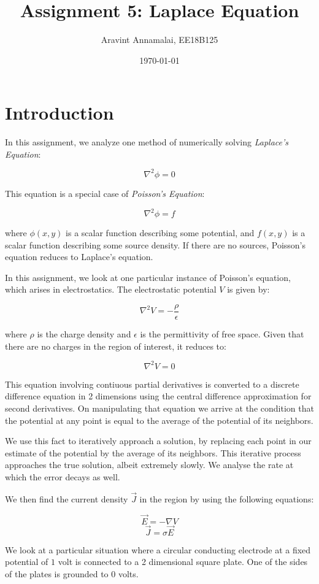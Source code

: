 \documentclass[11pt, a4paper]{article}
\title{Assignment 5: Laplace Equation} %
\author{Aravint Annamalai, EE18B125} %
\date{\today} %
\begin{document}
		
		
\maketitle %

\section{Introduction}
In this assignment, we analyze one method of numerically solving \emph{Laplace's Equation}:

\[\nabla^2 \phi = 0\]

This equation is a special case of \emph{Poisson's Equation}:

\[\nabla^2 \phi = f\]

where \(\phi(x,y)\) is a scalar function describing some potential, and \(f(x,y)\) is a scalar function describing some source density. If there are no sources, Poisson's equation reduces to Laplace's equation.

In this assignment, we look at one particular instance of Poisson's equation, which arises in electrostatics. The electrostatic potential
\(V\) is given by:

\[\nabla^2 V = -\frac{\rho}{\epsilon}\]

where \(\rho\) is the charge density and \(\epsilon\) is the permittivity of free space. Given that there are no charges in the region of interest, it reduces to:

\[\nabla^2 V = 0\]

This equation involving contiuous partial derivatives is converted to a discrete difference equation in 2 dimensions using the central difference approximation for second derivatives. On manipulating that equation we arrive at the condition that the potential at any point is equal to the average of the potential of its neighbors. 

We use this fact to iteratively approach a solution, by replacing each point in our estimate of the potential by the average of its neighbors. This iterative process approaches the true solution, albeit extremely slowly. We analyse the rate at which the error decays as well.

We then find the current density \(\vec{J}\) in the region by using the following equations:

\[\vec{E} = -\nabla V\] \[\vec{J} = \sigma \vec{E}\]

We look at a particular situation where a circular conducting electrode at a fixed potential of \(1\) volt is connected to a 2 dimensional square plate. One of the sides of the plates is grounded to \(0\) volts.
\end{document}
